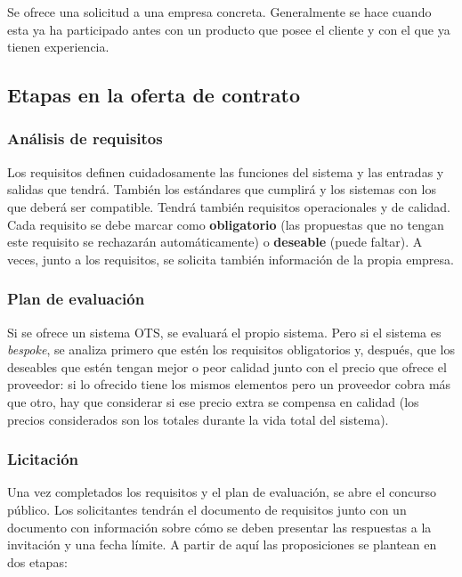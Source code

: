 \documentclass[12pt]{article}
\begin{document}
{Se ofrece una solicitud a una empresa concreta. Generalmente se hace cuando esta ya ha participado antes con un producto que posee el cliente y con el que ya tienen experiencia.}

\subsection{Etapas en la oferta de contrato}
\label{10.3.0}

\subsubsection{Análisis de requisitos}
\label{10.3.1}

{Los requisitos definen cuidadosamente las funciones del sistema y las entradas y salidas que tendrá. También los estándares que cumplirá y los sistemas con los que deberá ser compatible. Tendrá también requisitos operacionales y de calidad. Cada requisito se debe marcar como \textbf{obligatorio} (las propuestas que no tengan este requisito se rechazarán automáticamente) o \textbf{deseable} (puede faltar). A veces, junto a los requisitos, se solicita también información de la propia empresa.}

\subsubsection{Plan de evaluación}
\label{10.3.2}

{Si se ofrece un sistema OTS, se evaluará el propio sistema. Pero si el sistema es \textit{bespoke}, se analiza primero que estén los requisitos obligatorios y, después, que los deseables que estén tengan mejor o peor calidad junto con el precio que ofrece el proveedor: si lo ofrecido tiene los mismos elementos pero un proveedor cobra más que otro, hay que considerar si ese precio extra se compensa en calidad (los precios considerados son los totales durante la vida total del sistema).}

\subsubsection{Licitación}
\label{10.3.3}

{Una vez completados los requisitos y el plan de evaluación, se abre el concurso público. Los solicitantes tendrán el documento de requisitos junto con un documento con información sobre cómo se deben presentar las respuestas a la invitación y una fecha límite. A partir de aquí las proposiciones se plantean en dos etapas:} \bigskip
\end{document}
